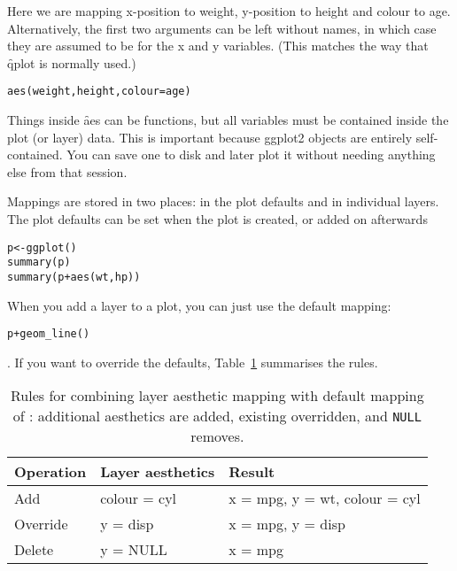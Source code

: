 Here we are mapping x-position to weight, y-position to height and colour to age.  Alternatively, the first two arguments can be left without names, in which case they are assumed to be for the x and y variables.  (This matches the way that \f{qplot} is normally used.)

\begin{alltt}
aes(weight, height, colour = age)
\end{alltt}

Things inside \f{aes} can be functions, but all variables must be contained inside the plot (or layer) data.  This is important because ggplot2 objects are entirely self-contained.  You can save one to disk and later plot it without needing anything else from that session.

Mappings are stored in two places: in the plot defaults and in individual layers.  The plot defaults can be set when the plot is created, or added on afterwards

\begin{alltt}
p <- ggplot()
summary(p)
summary(p + aes(wt, hp))
\end{alltt}

When you add a layer to a plot, you can just use the default mapping: 

\begin{alltt}
p + geom_line()
\end{alltt}

\noindent.  If you want to override the defaults, Table~\ref{tbl:aes-override} summarises the rules.

\begin{table}
  \begin{center}
  \begin{tabular}{lll}
    \toprule
    Operation & Layer aesthetics  & Result \\
    \midrule
    Add       & colour = cyl & x = mpg, y = wt, colour = cyl \\
    Override  & y = disp     & x = mpg, y = disp \\
    Delete    & y = NULL     & x = mpg \\
    \bottomrule
  \end{tabular}
  \end{center}
  \caption{Rules for combining layer aesthetic mapping with default mapping of :  additional aesthetics are added, existing overridden, and {\tt NULL} removes.}
  \label{tbl:aes-override}
\end{table}


